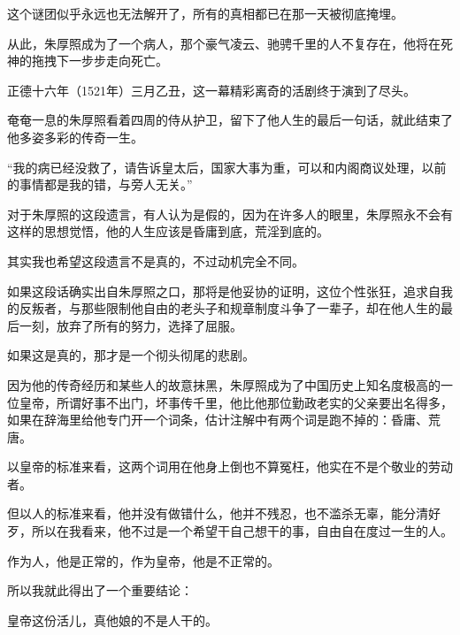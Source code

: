 \begin{multicols}{\theparacolNo}
这个谜团似乎永远也无法解开了，所有的真相都已在那一天被彻底掩埋。

从此，朱厚照成为了一个病人，那个豪气凌云、驰骋千里的人不复存在，他将在死神的拖拽下一步步走向死亡。

正德十六年（1521年）三月乙丑，这一幕精彩离奇的活剧终于演到了尽头。

奄奄一息的朱厚照看着四周的侍从护卫，留下了他人生的最后一句话，就此结束了他多姿多彩的传奇一生。

“我的病已经没救了，请告诉皇太后，国家大事为重，可以和内阁商议处理，以前的事情都是我的错，与旁人无关。”

对于朱厚照的这段遗言，有人认为是假的，因为在许多人的眼里，朱厚照永不会有这样的思想觉悟，他的人生应该是昏庸到底，荒淫到底的。

其实我也希望这段遗言不是真的，不过动机完全不同。

如果这段话确实出自朱厚照之口，那将是他妥协的证明，这位个性张狂，追求自我的反叛者，与那些限制他自由的老头子和规章制度斗争了一辈子，却在他人生的最后一刻，放弃了所有的努力，选择了屈服。

如果这是真的，那才是一个彻头彻尾的悲剧。

因为他的传奇经历和某些人的故意抹黑，朱厚照成为了中国历史上知名度极高的一位皇帝，所谓好事不出门，坏事传千里，他比他那位勤政老实的父亲要出名得多，如果在辞海里给他专门开一个词条，估计注解中有两个词是跑不掉的：昏庸、荒唐。

以皇帝的标准来看，这两个词用在他身上倒也不算冤枉，他实在不是个敬业的劳动者。

但以人的标准来看，他并没有做错什么，他并不残忍，也不滥杀无辜，能分清好歹，所以在我看来，他不过是一个希望干自己想干的事，自由自在度过一生的人。

作为人，他是正常的，作为皇帝，他是不正常的。

所以我就此得出了一个重要结论：

皇帝这份活儿，真他娘的不是人干的。
\ifnum{}
	\end{multicols}
\fi
\newpage
